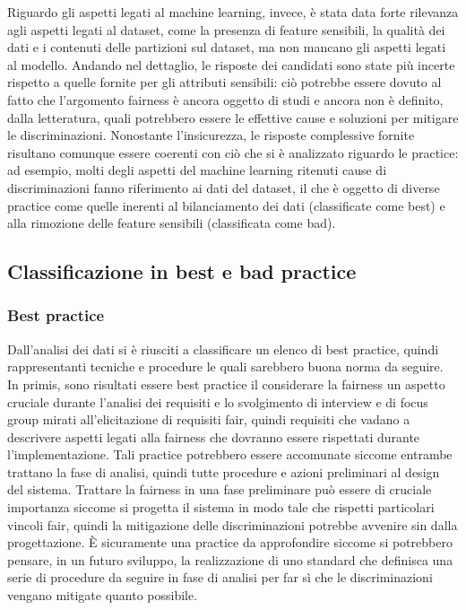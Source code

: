Riguardo gli aspetti legati al machine learning, invece, è stata data forte rilevanza agli aspetti legati al dataset, come la presenza di feature sensibili, la qualità dei dati e i contenuti delle partizioni sul dataset, ma non mancano gli aspetti legati al modello. Andando nel dettaglio, le risposte dei candidati sono state più incerte rispetto a quelle fornite per gli attributi sensibili: ciò potrebbe essere dovuto al fatto che l'argomento fairness è ancora oggetto di studi e ancora non è definito, dalla letteratura, quali potrebbero essere le effettive cause e soluzioni per mitigare le discriminazioni. Nonostante l'insicurezza, le risposte complessive fornite risultano comunque essere coerenti con ciò che si è analizzato riguardo le practice: ad esempio, molti degli aspetti del machine learning ritenuti cause di discriminazioni fanno riferimento ai dati del dataset, il che è oggetto di diverse practice come quelle inerenti al bilanciamento dei dati (classificate come best) e alla rimozione delle feature sensibili (classificata come bad).

\subsection{Classificazione in best e bad practice}
\subsubsection{Best practice}
Dall'analisi dei dati si è riusciti a classificare un elenco di best practice, quindi rappresentanti tecniche e procedure le quali sarebbero buona norma da seguire. In primis, sono risultati essere best practice il considerare la fairness un aspetto cruciale durante l'analisi dei requisiti e lo svolgimento di interview e di focus group mirati all'elicitazione di requisiti fair, quindi requisiti che vadano a descrivere aspetti legati alla fairness che dovranno essere rispettati durante l'implementazione. Tali practice potrebbero essere accomunate siccome entrambe trattano la fase di analisi, quindi tutte procedure e azioni preliminari al design del sistema. Trattare la fairness in una fase preliminare può essere di cruciale importanza siccome si progetta il sistema in modo tale che rispetti particolari vincoli fair, quindi la mitigazione delle discriminazioni potrebbe avvenire sin dalla progettazione. È sicuramente una practice da approfondire siccome si potrebbero pensare, in un futuro sviluppo, la realizzazione di uno standard che definisca una serie di procedure da seguire in fase di analisi per far sì che le discriminazioni vengano mitigate quanto possibile.

